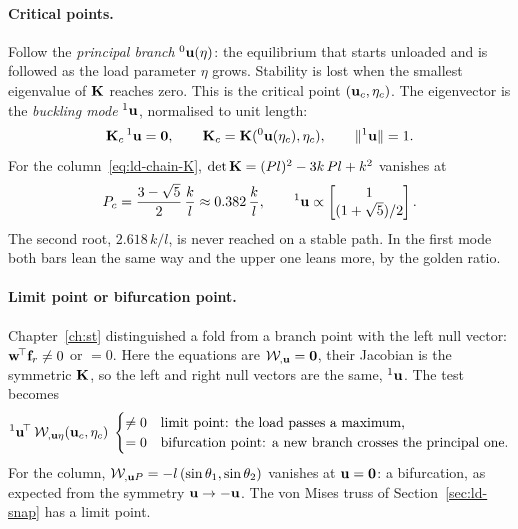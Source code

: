 \paragraph{Critical points.}
%
Follow the \emph{principal branch} ${}^0\mathbf{u}(\eta)$: the equilibrium that starts
unloaded and is followed as the load parameter $\eta$ grows. Stability is lost when
the smallest eigenvalue of $\mathbf{K}$ reaches zero. This is the critical point
$(\mathbf{u}_c,\eta_c)$. The eigenvector is the \emph{buckling mode}
${}^1\mathbf{u}$, normalised to unit length:
\begin{equation}\label{eq:ld-critical}
  \mathbf{K}_c\,{}^1\mathbf{u} = \mathbf{0}, \qquad \mathbf{K}_c = \mathbf{K}({}^0\mathbf{u}(\eta_c),\eta_c),
  \qquad \lVert {}^1\mathbf{u}\rVert = 1 .
\end{equation}
For the column~\eqref{eq:ld-chain-K},
$\det\mathbf{K} = (Pl)^2 - 3k\,Pl + k^2$ vanishes at
\begin{equation}\label{eq:ld-chain-Pc}
  P_c = \frac{3 - \sqrt5}{2}\,\frac kl \approx 0.382\,\frac kl, \qquad
  {}^1\mathbf{u} \propto \begin{bmatrix} 1 \\ (1 + \sqrt5)/2 \end{bmatrix} .
\end{equation}
The second root, $2.618\,k/l$, is never reached on a stable path. In the first mode
both bars lean the same way and the upper one leans more, by the golden ratio.

\paragraph{Limit point or bifurcation point.}
%
Chapter~\ref{ch:st} distinguished a fold from a branch point with the left null
vector: $\mathbf{w}^{\!\top}\mathbf{f}_r \neq 0$ or $= 0$. Here the equations are
$\mathcal{W}_{,\mathbf{u}} = \mathbf{0}$, their Jacobian is the symmetric $\mathbf{K}$, so the
left and right null vectors are the same, ${}^1\mathbf{u}$. The test becomes
\begin{equation}\label{eq:ld-limit-test}
  {}^1\mathbf{u}^{\!\top}\,\mathcal{W}_{,\mathbf{u}\eta}(\mathbf{u}_c,\eta_c)
  \;\begin{cases} \neq 0 & \text{limit point: the load passes a maximum,}\\
                 = 0 & \text{bifurcation point: a new branch crosses the principal one.}
  \end{cases}
\end{equation}
For the column, $\mathcal{W}_{,\mathbf{u}P} = -l\,(\sin\theta_1, \sin\theta_2)$ vanishes at
$\mathbf{u} = \mathbf{0}$: a bifurcation, as expected from the symmetry
$\mathbf{u} \to -\mathbf{u}$. The von Mises truss of Section~\ref{sec:ld-snap} has a limit point.


